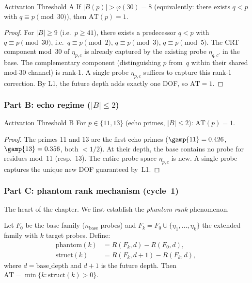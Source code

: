 \documentclass[12pt,a4paper]{article}
\begin{document}
\begin{thmbox}{Activation Threshold A}
\label{thm:AT_A}
If $|B(p)| > \varphi(30) = 8$ (equivalently: there exists $q < p$ with
$q \equiv p \pmod{30}$), then $\mathrm{AT}(p) = 1$.
\end{thmbox}

\begin{proof}
For $|B| \ge 9$ (i.e.\ $p \ge 41$), there exists a predecessor $q < p$ with $q \equiv p \pmod{30}$,
i.e.\ $q \equiv p \pmod{2}$, $q \equiv p \pmod{3}$, $q \equiv p \pmod{5}$.
The CRT component mod~30 of $\eta_{p,c}$ is already captured by the existing
probe $\eta_{q,c'}$ in the base.  The complementary component (distinguishing
$p$ from~$q$ within their shared mod-30 channel) is rank-1.  A single probe
$\eta_{p,c}$ suffices to capture this rank-1 correction.  By L1, the future
depth adds exactly one DOF, so $\mathrm{AT} = 1$.
\end{proof}

\subsubsection{Part B: echo regime ($|B| \le 2$)}

\begin{thmbox}{Activation Threshold B}
\label{thm:AT_B}
For $p \in \{11, 13\}$ (echo primes, $|B| \le 2$): $\mathrm{AT}(p) = 1$.
\end{thmbox}

\begin{proof}
The primes 11 and 13 are the first echo primes ($\gamp{11} = 0.426$,
$\gamp{13} = 0.356$, both $< 1/2$).  At their depth, the base contains no
probe for residues mod~11 (resp.\ 13).  The entire probe space $\eta_{p,c}$ is
new.  A single probe captures the unique new DOF guaranteed by~L1.
\end{proof}

\subsubsection{Part C: phantom rank mechanism (cycle~1)}

The heart of the chapter.  We first establish the \emph{phantom rank}
phenomenon.

\begin{definition}
\label{def:phantom_struct}
Let $F_0$ be the base family ($n_{\mathrm{base}}$ probes) and
$F_k = F_0 \cup \{\eta_1, \ldots, \eta_k\}$ the extended family with $k$
target probes.  Define:
\begin{align}
  \mathrm{phantom}(k) &= R(F_k, d) - R(F_0, d), \label{eq:phantom}\\
  \mathrm{struct}(k) &= R(F_k, d{+}1) - R(F_k, d), \label{eq:struct}
\end{align}
where $d = \mathrm{base\_depth}$ and $d{+}1$ is the future depth.
Then $\mathrm{AT} = \min\{k : \mathrm{struct}(k) > 0\}$.
\end{definition}
\end{document}
